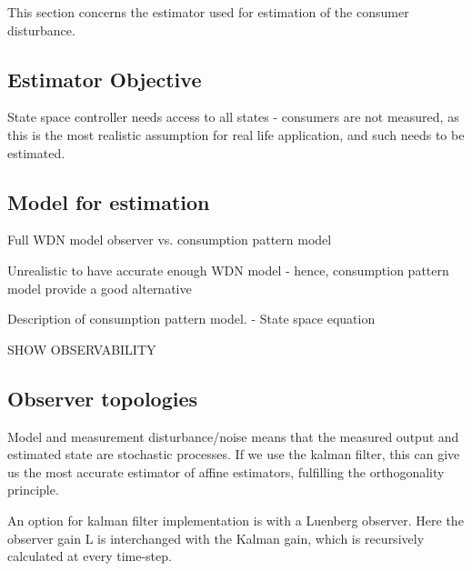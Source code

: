 This section concerns the estimator used for estimation of the consumer disturbance.

\subsection{Estimator Objective}

State space controller needs access to all states - consumers are not measured, as this is the most realistic assumption for real life application, and such needs to be estimated.




\subsection{Model for estimation}
Full WDN model observer vs. consumption pattern model

Unrealistic to have accurate enough WDN model - hence, consumption pattern model provide a good alternative


Description of consumption pattern model. 
 - State space equation
 
SHOW OBSERVABILITY

\subsection{Observer topologies}
Model and measurement disturbance/noise means that the measured output and estimated state are stochastic processes. If we use the kalman filter, this can give us the most accurate estimator of affine estimators, fulfilling the orthogonality principle. 

An option for kalman filter implementation is with a Luenberg observer. Here the observer gain L is interchanged with the Kalman gain, which is recursively calculated at every time-step.




